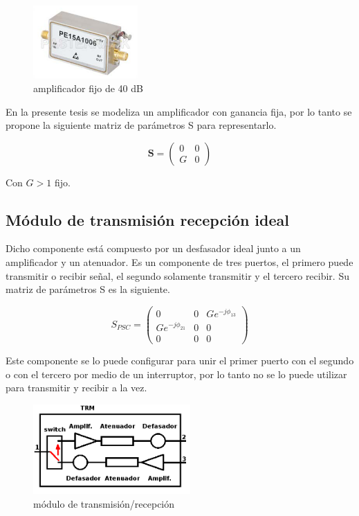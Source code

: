 \begin{figure}[H]
 \centering
 \includegraphics[width=4cm]{gfx/amplifier.png}
 \caption{amplificador fijo de 40 dB \cite{Pasternack2014}}
 \label{fig:amplifier}
\end{figure}

En la presente tesis se modeliza un amplificador con ganancia fija, por lo tanto se propone la siguiente matriz de parámetros S
para representarlo.

$$
\mathbf{S} = \begin{pmatrix} 0 & 0\\G & 0\end{pmatrix}
$$

Con $G > 1$ fijo.


\subsection{Módulo de transmisión recepción ideal}

Dicho componente está compuesto por un desfasador ideal junto a un amplificador y un atenuador. Es un componente de tres puertos,
el primero puede transmitir o recibir señal, el segundo solamente transmitir y el tercero recibir. Su matriz de parámetros S es
la siguiente.

$$
	S_{PSC} = \begin{pmatrix} 0&0&Ge^{-j\phi_{13}} \\ Ge^{-j\phi_{21}}&0&0 \\ 0&0&0\end{pmatrix} 
$$

Este componente se lo puede configurar para unir el primer puerto con el segundo o con el tercero por medio de un interruptor, 
por lo tanto no se lo puede utilizar para transmitir y recibir a la vez. 

\begin{figure}[H]
 \centering
 \includegraphics[width=6cm]{gfx/trm.png}
 \caption{módulo de transmisión/recepción}
 \label{fig:trm}
\end{figure}


